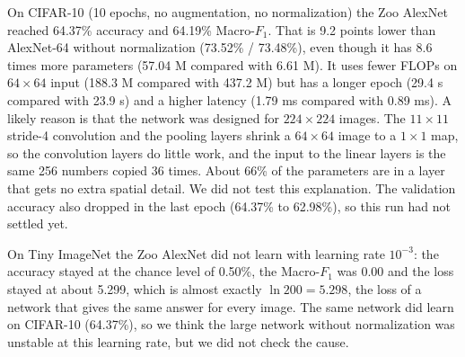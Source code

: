 \documentclass[12pt]{article}
\begin{document}
On CIFAR-10 (10 epochs, no augmentation, no normalization) the Zoo AlexNet reached 64.37\% accuracy and 64.19\%
Macro-$F_1$. That is 9.2 points lower than AlexNet-64 without normalization (73.52\% / 73.48\%), even though it has 8.6
times more parameters (57.04 M compared with 6.61 M). It uses fewer FLOPs on $64{\times}64$ input (188.3 M compared with
437.2 M) but has a longer epoch (29.4 s compared with 23.9 s) and a higher latency (1.79 ms compared with 0.89 ms). A
likely reason is that the network was designed for $224{\times}224$ images. The $11{\times}11$ stride-4 convolution and
the pooling layers shrink a $64{\times}64$ image to a $1{\times}1$ map, so the convolution layers do little work, and
the input to the linear layers is the same 256 numbers copied 36 times. About 66\% of the parameters are in a layer that
gets no extra spatial detail. We did not test this explanation. The validation accuracy also dropped in the last epoch
(64.37\% to 62.98\%), so this run had not settled yet.

On Tiny ImageNet the Zoo AlexNet did not learn with learning rate $10^{-3}$: the accuracy stayed at the chance level of
0.50\%, the Macro-$F_1$ was 0.00 and the loss stayed at about 5.299, which is almost exactly $\ln 200 = 5.298$, the
loss of a network that gives the same answer for every image. The same network did learn on CIFAR-10 (64.37\%), so we
think the large network without normalization was unstable at this learning rate, but we did not check the cause.
\end{document}
